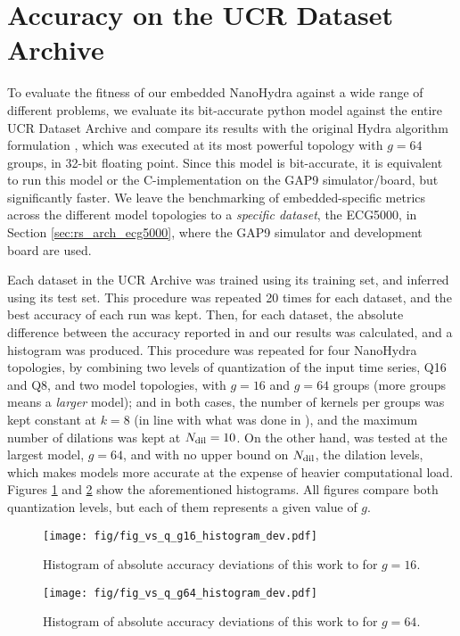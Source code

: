 \section{Accuracy on the UCR Dataset Archive}\label{sec:acc_ucr}
To evaluate the fitness of our embedded NanoHydra against a wide range of different problems, we evaluate its bit-accurate python model against the entire UCR Dataset Archive and
compare its results with the original Hydra algorithm formulation \cite{Dempster2023Hydra}, which was executed at its most powerful topology with $g=64$ groups, in 32-bit floating point.
Since this model is bit-accurate, it is equivalent to run this model or the C-implementation on the GAP9 simulator/board, but significantly faster. We leave the benchmarking of embedded-specific metrics
across the different model topologies to a \emph{specific dataset}, the ECG5000, in Section \ref{sec:rs_arch_ecg5000}, where the GAP9 simulator and development board are used.

Each dataset in the UCR Archive was trained using its training set, and inferred using its test set. This procedure was repeated 20 times for each dataset, and the best accuracy of each run was kept.
Then, for each dataset, the absolute difference between the accuracy reported in \cite{Dempster2023Hydra} and our results was calculated, and a histogram was produced. This procedure was repeated for four NanoHydra topologies,
by combining two levels of quantization of the input time series, Q16 and Q8, and two model topologies, with $g=16$ and $g=64$ groups (more groups means a \emph{larger} model); and in both cases, the number of kernels per groups
was kept constant at $k=8$ (in line with what was done in \cite{Dempster2023Hydra}), and the maximum number of dilations was kept at $N\sb{\text{dil}}=10$. 
On the other hand, \cite{Dempster2023Hydra} was tested at the largest model, $g=64$, and with no upper bound on $N\sb{\text{dil}}$, the dilation levels, which makes models more accurate at the expense of heavier computational load.
Figures \ref{fig:ucr_hist_vs_q_g16} and \ref{fig:ucr_hist_vs_q_g64} show the aforementioned histograms. All figures compare both quantization levels, but each of them represents a given value of $g$.

\begin{figure}[h!]
    \centerfloat
    \texttt{[image: fig/fig\_vs\_q\_g16\_histogram\_dev.pdf]}
    \caption{Histogram of absolute accuracy deviations of this work to \cite{Dempster2023Hydra} for $g=16$.}
    \label{fig:ucr_hist_vs_q_g16}
\end{figure}
\begin{figure}[h!]
    \centerfloat
    \texttt{[image: fig/fig\_vs\_q\_g64\_histogram\_dev.pdf]}
    \caption{Histogram of absolute accuracy deviations of this work to \cite{Dempster2023Hydra} for $g=64$.}
    \label{fig:ucr_hist_vs_q_g64}
\end{figure}

